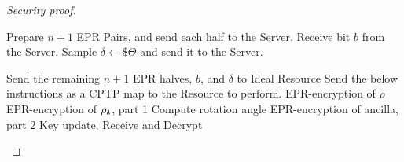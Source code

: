 \begin{proof}[Security proof]
\begin{reduction}
\begin{algorithmic}[1]
        \EndProcedure

    \end{algorithmic}
\end{reduction}

\begin{simulatorr}
    \caption{Blind State Injection}
    \label{simulator:blind-gate}
    \begin{algorithmic}[1]
        \State Prepare $n+1$ EPR Pairs, and send each half to the Server.
        \State Receive bit $b$ from the Server.
        \State Sample $\delta \gets \$\Theta$ and send it to the Server.
        \EndProcedure

        \State Send the remaining $n+1$ EPR halves, $b$, and $\delta$ to Ideal Resource
        \State Send the below instructions as a CPTP map to the Resource to perform.
        \EndProcedure
        \State EPR-encryption of $\rho$
        \State EPR-encryption of $\rho_{\mathtt{A}}$, part 1
        \State Compute rotation angle
        \State EPR-encryption of ancilla, part 2
        \State Key update, Receive and Decrypt
        \EndProcedure

    \end{algorithmic}
\end{simulatorr}
 \end{proof}
